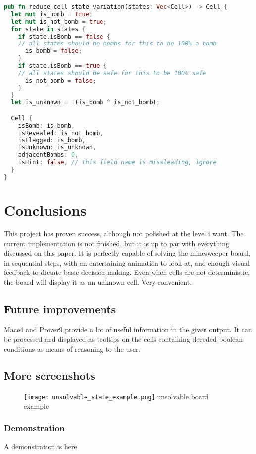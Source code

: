\documentclass{article}
\begin{document}
\begin{lstlisting}[language=rust]
pub fn reduce_cell_state_variation(states: Vec<Cell>) -> Cell {
  let mut is_bomb = true;
  let mut is_not_bomb = true;
  for state in states {
    if state.isBomb == false {
    // all states should be bombs for this to be 100% a bomb
      is_bomb = false;
    }
    if state.isBomb == true {
    // all states should be safe for this to be 100% safe
      is_not_bomb = false;
    }
  }
  let is_unknown = !(is_bomb ^ is_not_bomb);

  Cell {
    isBomb: is_bomb,
    isRevealed: is_not_bomb,
    isFlagged: is_bomb,
    isUnknown: is_unknown,
    adjacentBombs: 0,
    isHint: false, // this field name is missleading, ignore
  }
}
\end{lstlisting}

\section{Conclusions}
    This project has proven success, although not polished at the level i want. The current implementation is not finished, but it is up to par with everything discussed on this paper. It is perfectly capable of solving the minesweeper board, in sequential steps, with an entertaining animation to look at, and enough visual feedback to dictate basic decision making. Even when cells are not deterministic, the board will display it as an unknown cell. Very convenient.
    
    \subsection{Future improvements}
        Mace4 and Prover9 provide a lot of useful information in the given output. It can be processed and displayed as tooltips on the cells containing decoded boolean conditions as means of reasoning to the user.

    \subsection{More screenshots}
        \begin{figure}[H]
            \centering
            \texttt{[image: unsolvable\_state\_example.png]}
            unsolvable board example
        \end{figure}
        
        \subsubsection{Demonstration}
            A demonstration \href{https://raw.githubusercontent.com/GaussianWonder/minesweeper-prover9/main/assets/demonstration.gif}{is here}
\end{document}
